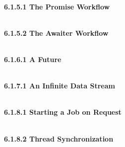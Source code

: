 

\hspace*{\fill} \\ %
\noindent
\textbf{6.1.5.1\hspace{0.2cm} The Promise Workflow}


\hspace*{\fill} \\ %
\noindent
\textbf{6.1.5.2\hspace{0.2cm} The Awaiter Workflow}




\hspace*{\fill} \\ %
\noindent
\textbf{6.1.6.1\hspace{0.2cm} A Future}


\hspace*{\fill} \\ %
\noindent
\textbf{6.1.7.1\hspace{0.2cm} An Infinite Data Stream}


\hspace*{\fill} \\ %
\noindent
\textbf{6.1.8.1\hspace{0.2cm} Starting a Job on Request}

\hspace*{\fill} \\ %
\noindent
\textbf{6.1.8.2\hspace{0.2cm} Thread Synchronization}
